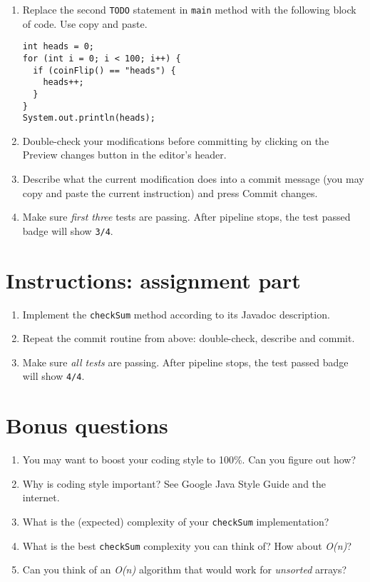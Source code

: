 \begin{enumerate}
  \begin{enumerate}
  \def\labelenumii{\arabic{enumii}.}
  \item
    Replace the second \texttt{TODO} statement in \texttt{main} method with the following block of code. Use copy and paste.

\begin{verbatim}
int heads = 0;
for (int i = 0; i < 100; i++) {
  if (coinFlip() == "heads") {
    heads++;
  }
}
System.out.println(heads);
\end{verbatim}
  \item
    Double-check your modifications before committing by clicking on the Preview changes button in the editor's header.
  \item
    Describe what the current modification does into a commit message (you may copy and paste the current instruction) and press Commit changes.
  \item
    Make sure \emph{first three} tests are passing. After pipeline stops, the test passed badge will show \texttt{3/4}.
  \end{enumerate}
\end{enumerate}

\section{Instructions: assignment part}\label{lab01-instructions-assignment-part}

\begin{enumerate}
\def\labelenumi{\arabic{enumi}.}
\item
  Implement the \texttt{checkSum} method according to its Javadoc description.
\item
  Repeat the commit routine from above: double-check, describe and commit.
\item
  Make sure \emph{all tests} are passing. After pipeline stops, the test passed badge will show \texttt{4/4}.
\end{enumerate}

\section{Bonus questions}\label{bonus-questions}

\begin{enumerate}
\def\labelenumi{\arabic{enumi}.}
\item
  You may want to boost your coding style to 100\%. Can you figure out how?
\item
  Why is coding style important? See Google Java Style Guide and the internet.
\item
  What is the (expected) complexity of your \texttt{checkSum} implementation?
\item
  What is the best \texttt{checkSum} complexity you can think of? How about \emph{O(n)}?
\item
  Can you think of an \emph{O(n)} algorithm that would work for \emph{unsorted} arrays?
\end{enumerate}
